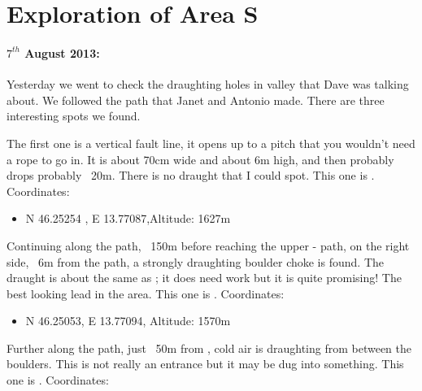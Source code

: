 \section{ Exploration of Area S}

\begin{marginfigure}
\end{marginfigure}
\paragraph{$7^{th}$ August 2013: } Yesterday we went to check the draughting holes in  valley that Dave was talking about. We followed the path that Janet and Antonio made. There are three interesting spots we found.

The first one is a vertical fault line, it opens up to a pitch that you wouldn't need a rope to go in. It is about 70cm wide and about 6m high, and then probably drops probably ~20m. There is no draught that I could spot.
This one is . Coordinates:

\begin{itemize}
	\item N 46.25254 , E 13.77087,Altitude: 1627m
\end{itemize}


Continuing along the path, ~150m before reaching the upper - path, on the right side, ~6m from the path, a strongly draughting boulder choke is found. The draught is about the same as ; it does need work but it is quite promising! The best looking lead in the area.
This one is . Coordinates:

\begin{itemize}
	\item N 46.25053, E 13.77094, Altitude: 1570m
\end{itemize}

Further along the path, just ~50m from , cold air is draughting from between the boulders. This is not really an entrance but it may be dug into something. This one is . Coordinates:

